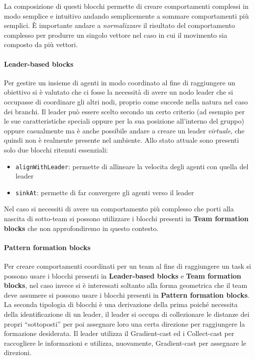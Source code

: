 \documentclass[12pt,a4paper,openright,twoside]{book}
\begin{document}
La composizione di questi blocchi permette di creare comportamenti complessi in modo semplice e intuitivo andando semplicemente a sommare comportamenti più semplici. È importante andare a \textit{normalizzare} il risultato del comportamento complesso per produrre un singolo vettore nel caso in cui il movimento sia composto da più vettori.

\paragraph{Leader-based blocks} Per gestire un insieme di agenti in modo coordinato al fine di raggiungere un obiettivo si è valutato che ci fosse la necessità di avere un nodo leader che si occupasse di coordinare gli altri nodi, proprio come succede nella natura nel caso dei branchi. Il leader può essere scelto secondo un certo criterio (ad esempio per le sue caratteristiche speciali oppure per la sua posizione all'interno del gruppo) oppure casualmente ma è anche possibile andare a creare un leader \textit{virtuale}, che quindi non è realmente presente nel ambiente. Allo stato attuale sono presenti solo due blocchi ritenuti essenziali:
\begin{itemize}
    \item \verb|alignWithLeader|: permette di allineare la velocita degli agenti con quella del leader
    \item \verb|sinkAt|: permette di far convergere gli agenti verso il leader
\end{itemize} 

Nel caso si necessiti di avere un comportamento più complesso che porti alla nascita di sotto-team si possono utilizzare i blocchi presenti in \textbf{Team formation blocks} che non approfondiremo in questo contesto.

\paragraph{Pattern formation blocks}
Per creare comportamenti coordinati per un team al fine di raggiungere un task si possono usare i blocchi presenti in \textbf{Leader-based blocks} e \textbf{Team formation blocks}, nel caso invece si è interessati soltanto alla forma geometrica che il team deve assumere si possono usare i blocchi presenti in \textbf{Pattern formation blocks}. La seconda tipologia di blocchi è una derivazione della prima poiché necessita della identificazione di un leader, il leader si occupa di collezionare le distanze dei propri ``sottoposti'' per poi assegnare loro una certa direzione per raggiungere la formazione desiderata. Il leader utilizza il Gradient-cast ed i Collect-cast per raccogliere le informazioni e utilizza, nuovamente, Gradient-cast per assegnare le direzioni.
\end{document}
